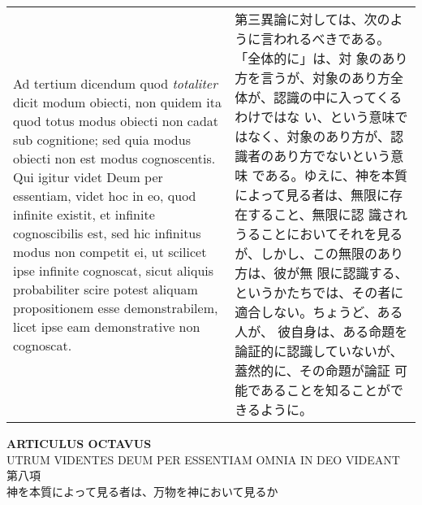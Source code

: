 \documentclass[10pt]{jsarticle} %
\begin{document}
\begin{longtable}{p{21em}p{21em}}
\\

{\sc Ad tertium dicendum} quod {\it totaliter} dicit modum obiecti,
non quidem ita quod totus modus obiecti non cadat sub cognitione; sed
quia modus obiecti non est modus cognoscentis. Qui igitur videt Deum
per essentiam, videt hoc in eo, quod infinite existit, et infinite
cognoscibilis est, sed hic infinitus modus non competit ei, ut
scilicet ipse infinite cognoscat, sicut aliquis probabiliter scire
potest aliquam propositionem esse demonstrabilem, licet ipse eam
demonstrative non cognoscat.

&

第三異論に対しては、次のように言われるべきである。「全体的に」は、対
象のあり方を言うが、対象のあり方全体が、認識の中に入ってくるわけではな
い、という意味ではなく、対象のあり方が、認識者のあり方でないという意味
である。ゆえに、神を本質によって見る者は、無限に存在すること、無限に認
識されうることにおいてそれを見るが、しかし、この無限のあり方は、彼が無
限に認識する、というかたちでは、その者に適合しない。ちょうど、ある人が、
彼自身は、ある命題を論証的に認識していないが、蓋然的に、その命題が論証
可能であることを知ることができるように。

\end{longtable}

\newpage
{}

\begin{center}
 {\Large {\bf ARTICULUS OCTAVUS}}\\
{\large UTRUM VIDENTES DEUM PER ESSENTIAM OMNIA IN DEO VIDEANT\\
第八項\\
神を本質によって見る者は、万物を神において見るか}
\end{center}
\end{document}
